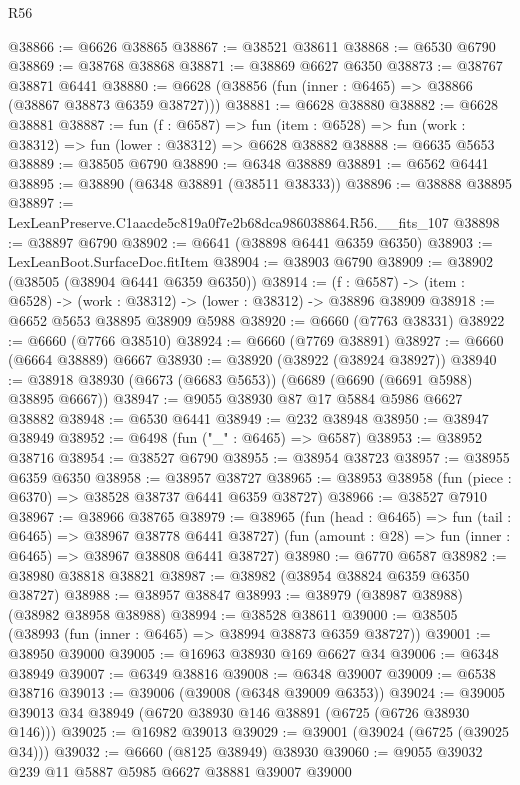\begin{lexlean}{R56}
\begin{coremodule}
@38866 := @6626 @38865
@38867 := @38521 @38611
@38868 := @6530 @6790
@38869 := @38768 @38868
@38871 := @38869 @6627 @6350
@38873 := @38767 @38871 @6441
@38880 := @6628 (@38856 (fun (inner : @6465) => @38866 (@38867 @38873 @6359 @38727)))
@38881 := @6628 @38880
@38882 := @6628 @38881
@38887 := fun (f : @6587) =>
  fun (item : @6528) => fun (work : @38312) => fun (lower : @38312) => @6628 @38882
@38888 := @6635 @5653
@38889 := @38505 @6790
@38890 := @6348 @38889
@38891 := @6562 @6441
@38895 := @38890 (@6348 @38891 (@38511 @38333))
@38896 := @38888 @38895
@38897 := LexLeanPreserve.C1aacde5c819a0f7e2b68dca986038864.R56.__fits_107
@38898 := @38897 @6790
@38902 := @6641 (@38898 @6441 @6359 @6350)
@38903 := LexLeanBoot.SurfaceDoc.fitItem
@38904 := @38903 @6790
@38909 := @38902 (@38505 (@38904 @6441 @6359 @6350))
@38914 := (f : @6587) -> (item : @6528) -> (work : @38312) -> (lower : @38312) -> @38896 @38909
@38918 := @6652 @5653 @38895 @38909 @5988
@38920 := @6660 (@7763 @38331)
@38922 := @6660 (@7766 @38510)
@38924 := @6660 (@7769 @38891)
@38927 := @6660 (@6664 @38889) @6667
@38930 := @38920 (@38922 (@38924 @38927))
@38940 := @38918 @38930 (@6673 (@6683 @5653)) (@6689 (@6690 (@6691 @5988) @38895 @6667))
@38947 := @9055 @38930 @87 @17 @5884 @5986 @6627 @38882
@38948 := @6530 @6441
@38949 := @232 @38948
@38950 := @38947 @38949
@38952 := @6498 (fun ("_" : @6465) => @6587)
@38953 := @38952 @38716
@38954 := @38527 @6790
@38955 := @38954 @38723
@38957 := @38955 @6359 @6350
@38958 := @38957 @38727
@38965 := @38953 @38958 (fun (piece : @6370) => @38528 @38737 @6441 @6359 @38727)
@38966 := @38527 @7910
@38967 := @38966 @38765
@38979 := @38965
    (fun (head : @6465) => fun (tail : @6465) => @38967 @38778 @6441 @38727)
    (fun (amount : @28) => fun (inner : @6465) => @38967 @38808 @6441 @38727)
@38980 := @6770 @6587
@38982 := @38980 @38818 @38821
@38987 := @38982 (@38954 @38824 @6359 @6350 @38727)
@38988 := @38957 @38847
@38993 := @38979 (@38987 @38988) (@38982 @38958 @38988)
@38994 := @38528 @38611
@39000 := @38505 (@38993 (fun (inner : @6465) => @38994 @38873 @6359 @38727))
@39001 := @38950 @39000
@39005 := @16963 @38930 @169 @6627 @34
@39006 := @6348 @38949
@39007 := @6349 @38816
@39008 := @6348 @39007
@39009 := @6538 @38716
@39013 := @39006 (@39008 (@6348 @39009 @6353))
@39024 := @39005 @39013 @34 @38949 (@6720 @38930 @146 @38891 (@6725 (@6726 @38930 @146)))
@39025 := @16982 @39013
@39029 := @39001 (@39024 (@6725 (@39025 @34)))
@39032 := @6660 (@8125 @38949) @38930
@39060 := @9055
    @39032
    @239
    @11
    @5887
    @5985
    @6627
    @38881
    @39007
    @39000

\end{coremodule}
\end{lexlean}
